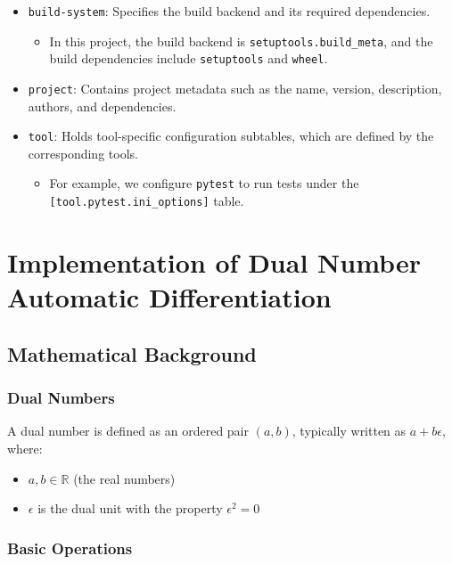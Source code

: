 \documentclass{article}
\begin{document}
\begin{itemize}
    \item \texttt{build-system}: Specifies the build backend and its required dependencies.
    \begin{itemize}
        \item In this project, the build backend is \texttt{setuptools.build\_meta}, and the build dependencies include \texttt{setuptools} and \texttt{wheel}.
    \end{itemize}
    \item \texttt{project}: Contains project metadata such as the name, version, description, authors, and dependencies.
    \item \texttt{tool}: Holds tool-specific configuration subtables, which are defined by the corresponding tools.
    \begin{itemize}
        \item For example, we configure \texttt{pytest} to run tests under the \texttt{[tool.pytest.ini\_options]} table.
    \end{itemize}
\end{itemize}


\section{Implementation of Dual Number Automatic Differentiation}

\subsection{Mathematical Background\cite{automatic_differentiation_wikipedia}}

\subsubsection*{Dual Numbers}

A dual number is defined as an ordered pair $(a, b)$, typically written as $a + b\epsilon$, where:

\begin{itemize}
    \item $a, b \in \mathbb{R}$ (the real numbers)
    \item $\epsilon$ is the dual unit with the property $\epsilon^2 = 0$
\end{itemize}

\subsubsection*{Basic Operations}
\end{document}
